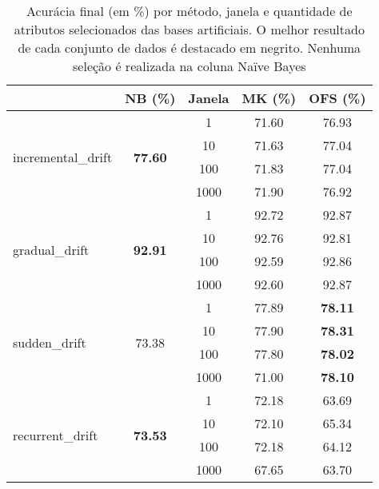 \begin{table}[!ht]
\centering
\caption[Acurácia final (em \%) por método, janela e quantidade de atributos selecionados das bases artificiais]{Acurácia final (em \%) por método, janela e quantidade de atributos selecionados das bases artificiais. O melhor resultado de cada conjunto de dados é destacado em negrito. Nenhuma seleção é realizada na coluna Naïve Bayes}
\label{tab:acc_winsize2}
\begin{tabular}{lcccc}
    \toprule
   \multirow{2}{*}{} &
      \multicolumn{1}{c}{NB (\%) } &
       \multicolumn{1}{c}{Janela} &
      \multicolumn{1}{c}{MK (\%)} &  
      \multicolumn{1}{c}{OFS (\%)} \\ 
		\midrule
 \multirow{4}{*}{incremental\_drift} & \multirow{4}{*}{\textbf{77.60}} & 1 & 71.60 & 76.93 \\ 
     & & 10 & 71.63 & 77.04 \\
     & & 100 & 71.83 & 77.04\\
    & & 1000 & 71.90 & 76.92\\ 
     \multirow{4}{*}{gradual\_drift} & \multirow{4}{*}{\textbf{92.91}} & 1 & 92.72 & 92.87 \\
    & & 10 & 92.76 & 92.81 \\
     & & 100 & 92.59 & 92.86 \\
    & & 1000 & 92.60 & 92.87\\
    \multirow{4}{*}{sudden\_drift} & \multirow{4}{*}{73.38} & 1 & 77.89 & \textbf{78.11} \\
     & & 10 & 77.90 & \textbf{78.31}\\
     & & 100 & 77.80 & \textbf{78.02}\\
    & & 1000 & 71.00 & \textbf{78.10}\\
    \multirow{4}{*}{recurrent\_drift} & \multirow{4}{*}{\textbf{73.53}} & 1 & 72.18 & 63.69 \\
     & & 10 & 72.10 & 65.34\\
     & & 100 & 72.18 & 64.12\\
    & & 1000 & 67.65& 63.70\\
     \bottomrule
\end{tabular}
\end{table}





